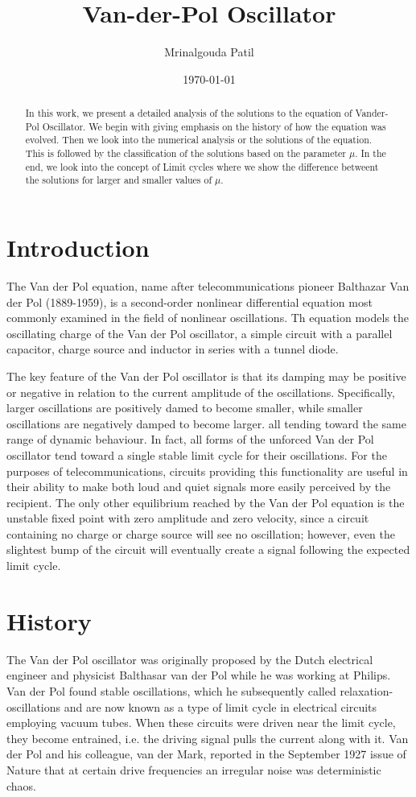 \documentclass[12pt, a4paper]{report}
\title{Van-der-Pol Oscillator}
\author{Mrinalgouda Patil}
\affil{Rollno: 130010061}
\date{\today}
\begin{document}
\maketitle

\begin{abstract}
In this work, we present a detailed analysis of the solutions to the equation of Vander-Pol Oscillator. We begin with giving emphasis on the history of how the equation was evolved. Then we look into the numerical analysis or the solutions of the equation. This is followed by the classification of the solutions based on the parameter $\mu$. In the end, we look into the concept of Limit cycles where we show the difference betweent the solutions for larger and smaller values of $\mu$. 
\end{abstract}

\chapter{Introduction}
The Van der Pol equation, name after telecommunications pioneer Balthazar Van der Pol (1889-1959), is a second-order nonlinear differential equation most commonly examined in the field of nonlinear oscillations. Th equation models the oscillating charge of the Van der Pol oscillator, a simple circuit with a parallel capacitor, charge source and inductor in series with a tunnel diode.
\par
The key feature  of the Van der Pol oscillator is that its damping may be positive or negative in relation to the current amplitude of the oscillations. Specifically, larger oscillations are positively damed to become smaller, while smaller oscillations are negatively damped to become larger. all tending toward the same range of dynamic behaviour. In fact, all forms of the unforced Van der Pol oscillator tend toward a single stable limit cycle for their oscillations. For the purposes of telecommunications, circuits providing this functionality are useful in their ability to make both loud and quiet signals more easily perceived by the recipient. The only other equilibrium reached by the Van der Pol equation is the unstable  fixed point with zero amplitude and zero velocity, since a circuit containing no charge or charge source will see no oscillation; however, even the slightest bump of the circuit will eventually create a signal following the expected limit cycle.

\chapter{History}
The Van der Pol oscillator was originally proposed by the Dutch electrical engineer and physicist Balthasar van der Pol while he was working at Philips. Van der Pol found stable oscillations, which he subsequently called relaxation-oscillations and are now known as a type of limit cycle in electrical circuits employing vacuum tubes. When these circuits were driven near the limit cycle, they become entrained, i.e. the driving signal pulls the current along with it. Van der Pol and his colleague, van der Mark, reported in the September 1927 issue of Nature that at certain drive frequencies an irregular noise was deterministic chaos.
\end{document}
